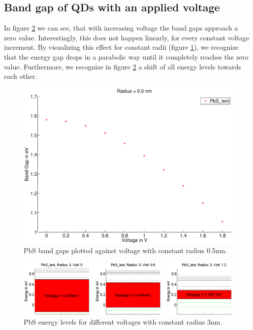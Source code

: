 \newpage
\subsection{Band gap of QDs with an applied voltage}
	In figure \ref{fig:EnergyLevels_Volt} we can see, that with increasing voltage the band gaps approach a zero value. Interestingly, this does not happen linearly, 
	for every constant voltage increment. By visualizing this effect for constant radii (figure \ref{fig:BandGap_Volt}), we recognize that the energy gap drops
	in a	parabolic way until it completely reaches the zero value. Furthermore, we recognize in figure \ref{fig:EnergyLevels_Volt} a shift of all energy 
	levels towards each other.
	\begin{figure}
		\includegraphics[width=\textwidth]{Fig/Plots/BandGap_Volt.eps}
		\caption{PbS band gaps plotted against voltage with constant radius 0.5nm.}
		\label{fig:BandGap_Volt}
	\end{figure}
	\begin{figure}
		\includegraphics[width=\textwidth]{Fig/Plots/EnergyLevels.eps}
		\caption{PbS energy levels for different voltages with constant radius 3nm.}
		\label{fig:EnergyLevels_Volt}
	\end{figure}
	
